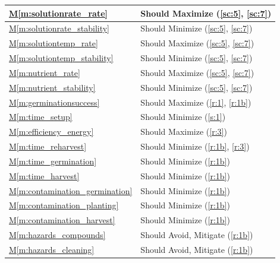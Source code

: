 \documentclass{../tex/report}
\newcommand{\mref}[1]{\hyperref[#1]{M\ref{#1}}}
\begin{document}
\begin{tabular}{|l|p{14.35cm}|}
    \mref{m:solutionrate_rate}          & Should Maximize           \hfill (\ref{sc:5}, \ref{sc:7})             \\ \hline
    \mref{m:solutionrate_stability}     & Should Minimize           \hfill (\ref{sc:5}, \ref{sc:7})             \\ \hline
    \mref{m:solutiontemp_rate}          & Should Maximize           \hfill (\ref{sc:5}, \ref{sc:7})             \\ \hline
    \mref{m:solutiontemp_stability}     & Should Minimize           \hfill (\ref{sc:5}, \ref{sc:7})             \\ \hline
    \mref{m:nutrient_rate}              & Should Maximize           \hfill (\ref{sc:5}, \ref{sc:7})             \\ \hline
    \mref{m:nutrient_stability}         & Should Minimize           \hfill (\ref{sc:5}, \ref{sc:7})             \\ \hline
    \mref{m:germinationsuccess}         & Should Maximize           \hfill (\ref{r:1}, \ref{r:1b})              \\ \hline
    \mref{m:time_setup}                 & Should Minimize           \hfill (\ref{s:1})                          \\ \hline
    \mref{m:efficiency_energy}          & Should Maximize           \hfill (\ref{r:3})                          \\ \hline
    \mref{m:time_reharvest}             & Should Minimize           \hfill (\ref{r:1b}, \ref{r:3})              \\ \hline
    \mref{m:time_germination}           & Should Minimize           \hfill (\ref{r:1b})                         \\ \hline
    \mref{m:time_harvest}               & Should Minimize           \hfill (\ref{r:1b})                         \\ \hline
    \mref{m:contamination_germination}  & Should Minimize           \hfill (\ref{r:1b})                         \\ \hline
    \mref{m:contamination_planting}     & Should Minimize           \hfill (\ref{r:1b})                         \\ \hline
    \mref{m:contamination_harvest}      & Should Minimize           \hfill (\ref{r:1b})                         \\ \hline
    \mref{m:hazards_compounds}          & Should Avoid, Mitigate    \hfill (\ref{r:1b})                         \\ \hline
    \mref{m:hazards_cleaning}           & Should Avoid, Mitigate    \hfill (\ref{r:1b})                         \\ \hline

\end{tabular}
\end{document}

